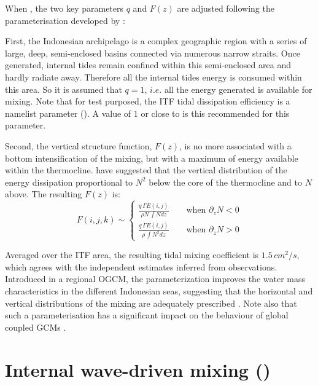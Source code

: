\documentclass[../main/NEMO_manual]{subfiles}
\begin{document}
When , the two key parameters $q$ and $F(z)$ are adjusted following
the parameterisation developed by \citet{Koch-Larrouy_al_GRL07}:

First, the Indonesian archipelago is a complex geographic region with a series of
large, deep, semi-enclosed basins connected via numerous narrow straits.
Once generated, internal tides remain confined within this semi-enclosed area and hardly radiate away.
Therefore all the internal tides energy is consumed within this area.
So it is assumed that $q = 1$, $i.e.$ all the energy generated is available for mixing.
Note that for test purposed, the ITF tidal dissipation efficiency is a namelist parameter ().
A value of $1$ or close to is this recommended for this parameter.

Second, the vertical structure function, $F(z)$, is no more associated with a bottom intensification of the mixing,
but with a maximum of energy available within the thermocline.
\citet{Koch-Larrouy_al_GRL07} have suggested that the vertical distribution of
the energy dissipation proportional to $N^2$ below the core of the thermocline and to $N$ above. 
The resulting $F(z)$ is:
\[
  F(i,j,k) \sim     \left\{
    \begin{aligned}
      \frac{q\,\Gamma E(i,j) } {\rho N \, \int N     dz}    \qquad \text{when $\partial_z N < 0$} \\
      \frac{q\,\Gamma E(i,j) } {\rho     \, \int N^2 dz}    \qquad \text{when $\partial_z N > 0$}
    \end{aligned}
  \right.
\]

Averaged over the ITF area, the resulting tidal mixing coefficient is $1.5\,cm^2/s$, 
which agrees with the independent estimates inferred from observations.
Introduced in a regional OGCM, the parameterization improves the water mass characteristics in
the different Indonesian seas, suggesting that the horizontal and vertical distributions of
the mixing are adequately prescribed \citep{Koch-Larrouy_al_GRL07, Koch-Larrouy_al_OD08a, Koch-Larrouy_al_OD08b}.
Note also that such a parameterisation has a significant impact on the behaviour of
global coupled GCMs \citep{Koch-Larrouy_al_CD10}.

\section{Internal wave-driven mixing (\protect{})}
\label{sec:ZDF_tmx_new}
\end{document}
